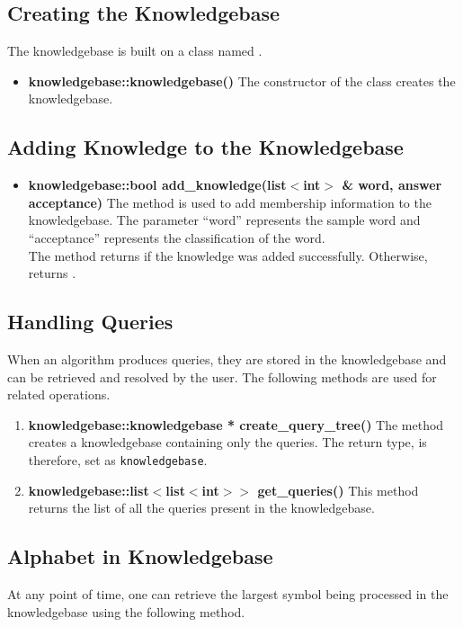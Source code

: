 \subsection*{Creating the Knowledgebase}
The knowledgebase is built on a class named \knowledgebase. 
\begin{itemize}
 \item \textbf{knowledgebase::knowledgebase()} \vskip 1pt
	The constructor of the \knowledgebase class creates the knowledgebase.
\end{itemize}
	
\subsection*{Adding Knowledge to the Knowledgebase} 
\begin{itemize}
\item \textbf{knowledgebase::bool add\_knowledge(list$<$int$>$ \& word, answer acceptance)} \vskip 1pt
The method is used to add membership information to the knowledgebase. The parameter ``word'' represents the sample word and ``acceptance'' represents the classification of the word. \\
The method returns \true if the knowledge was added successfully. Otherwise, returns \false.
\end{itemize}	

\subsection*{Handling Queries}
When an \online algorithm produces queries, they are stored in the knowledgebase and can be retrieved and resolved by the user. The following methods are used for related operations.

\begin{enumerate}
\item \textbf{knowledgebase::knowledgebase * create\_query\_tree()} \vskip 1pt
The method creates a knowledgebase containing only the queries. The return type, is therefore, set as \texttt{knowledgebase}.
	
\item \textbf{knowledgebase::list$<$list$<$int$>$$>$ get\_queries()} \vskip 1pt
This method returns the list of all the queries present in the knowledgebase.
\end{enumerate}

\subsection*{Alphabet in Knowledgebase}
At any point of time, one can retrieve the largest symbol being processed in the knowledgebase using the following method.

